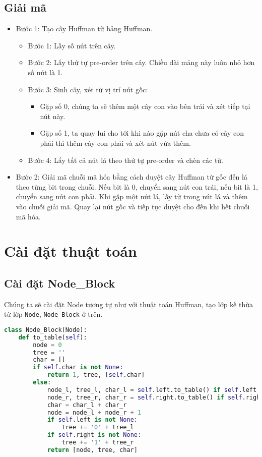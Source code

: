     \subsection{Giải mã}
     \begin{itemize}
            \item Bước 1: Tạo cây Huffman từ bảng Huffman.
                \begin{itemize}
                    \item Bước 1: Lấy số nút trên cây.
                    \item Bước 2: Lấy thứ tự pre-order trên cây. Chiều dài mảng này luôn nhỏ hơn số nút là 1.
                    \item Bước 3: Sinh cây, xét từ vị trí nút gốc:
                        \begin{itemize}
                            \item Gặp số 0, chúng ta sẽ thêm một cây con vào bên trái và xét tiếp tại nút này.
                            \item Gặp số 1, ta quay lui cho tới khi nào gặp nút cha chưa có cây con phải thì thêm cây con phải và xét nút vừa thêm.
                        \end{itemize}
                    \item Bước 4: Lấy tất cả nút lá theo thứ tự pre-order và chèn các từ.
                \end{itemize}
            \item Bước 2: Giải mã chuỗi mã hóa bằng cách duyệt cây Huffman từ gốc đến lá theo từng bit trong chuỗi. Nếu bit là 0, chuyển sang nút con trái, nếu bit là 1, chuyển sang nút con phải. Khi gặp một nút lá, lấy từ trong nút lá và thêm vào chuỗi giải mã. Quay lại nút gốc và tiếp tục duyệt cho đến khi hết chuỗi mã hóa.
        \end{itemize}
\section{Cài đặt thuật toán}

    \subsection{Cài đặt Node\_Block}
        Chúng ta sẽ cài đặt Node tương tự như với thuật toán Huffman, tạo lớp kế thừa từ lớp \lstinline{Node}, \lstinline{Node_Block}  ở trên.
\begin{lstlisting}[language=Python]
class Node_Block(Node):
    def to_table(self):
        node = 0
        tree = ''
        char = []
        if self.char is not None:
            return 1, tree, [self.char]
        else:
            node_l, tree_l, char_l = self.left.to_table() if self.left is not None else (0, '', [])
            node_r, tree_r, char_r = self.right.to_table() if self.right is not None else (0, '', [])
            char = char_l + char_r
            node = node_l + node_r + 1
            if self.left is not None:
                tree += '0' + tree_l
            if self.right is not None:
                tree += '1' + tree_r
            return [node, tree, char]
\end{lstlisting}

